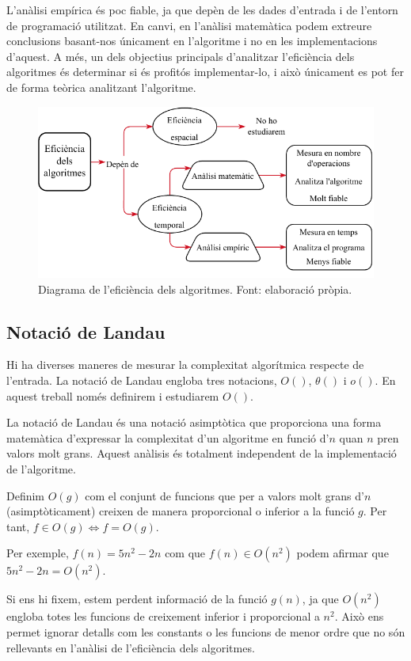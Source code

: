 L'anàlisi empírica és poc fiable, ja que depèn de les dades d'entrada i de l'entorn de programació utilitzat. En canvi, en l'anàlisi matemàtica podem extreure conclusions basant-nos únicament en l'algoritme i no en les implementacions d'aquest. A més, un dels objectius principals d'analitzar l'eficiència dels algoritmes és determinar si és profitós implementar-lo, i això únicament es pot fer de forma teòrica analitzant l'algoritme.

\begin{figure}[H]
    \centering
    \includegraphics[width=.8\textwidth]{capitols/figures/diagram.drawio (1).pdf}
    \caption[Diagrama de l'eficiència dels algoritmes.]{Diagrama de l'eficiència dels algoritmes. Font: elaboració pròpia.}
    \label{Figura}
\end{figure}

\subsection{Notació de Landau}
Hi ha diverses maneres de mesurar la complexitat algorítmica respecte de l'entrada. La notació de Landau engloba tres notacions, $O()$, $\theta()$ i $o()$. En aquest treball només definirem i estudiarem $O()$.

La notació de Landau és una notació asimptòtica que proporciona una forma matemàtica d'expressar la complexitat d'un algoritme en funció d'$n$ quan $n$ pren valors molt grans. Aquest anàlisis és totalment independent de la implementació de l'algoritme.

Definim $O(g)$ com el conjunt de funcions que per a valors molt grans d'$n$ (asimptòticament) creixen de manera proporcional o inferior a la funció $g$. Per tant, $f \in O(g) \iff f = O(g)$.

Per exemple, $f(n) = 5n^2 - 2n$ com que $f(n) \in O(n^2)$ podem afirmar que $5n^2 - 2n = O(n^2)$. 

Si ens hi fixem, estem perdent informació de la funció $g(n)$, ja que $O(n^2)$ engloba totes les funcions de creixement inferior i proporcional a $n^2$. Això ens permet ignorar detalls com les constants o les funcions de menor ordre que no són rellevants en l'anàlisi de l'eficiència dels algoritmes.

